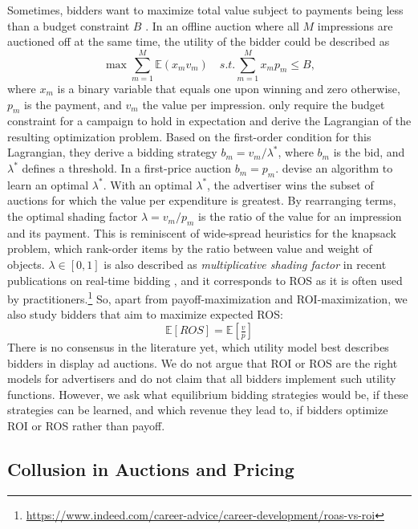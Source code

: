 \documentclass{article}
\begin{document}
Sometimes, bidders want to maximize total value subject to payments being less than a budget constraint 
$B$ \citep{tunuguntla2021near}. In an offline auction where all $M$ impressions are auctioned off at the same time, the utility of the bidder could be described as
\[\max \sum_{m=1}^M\mathbb{E}(x_m v_m) \quad 
s.t. \sum_{m=1}^M x_m p_m \leq B,
\]
where $x_m$ is a binary variable that equals one upon winning and zero otherwise, $p_m$ is the payment, and $v_m$ the value per impression. \citet{tunuguntla2021near} only require the budget constraint for a campaign to hold in expectation and derive the Lagrangian of the resulting optimization problem. Based on the first-order condition for this Lagrangian, they derive a bidding strategy $b_m = v_m/\lambda^*$, where $b_m$ is the bid, and $\lambda^*$ defines a threshold. In a first-price auction $b_m=p_m$. \citet{tunuguntla2021near} devise an algorithm to learn an optimal $\lambda^*$. With an optimal $\lambda^*$, the advertiser wins the subset of auctions for which the value per expenditure is greatest.
By rearranging terms, the optimal shading factor $\lambda=v_m/p_m$ is the ratio of the value for an impression and its payment. This is reminiscent of wide-spread heuristics for the knapsack problem, which rank-order items by the ratio between value and weight of objects. $\lambda \in [0,1]$ is also described as \textit{multiplicative shading factor} in recent publications on real-time bidding \citep{balseiro2019learning, Tardos2022}, and it corresponds to ROS as it is often used by practitioners.\footnote{\url{https://www.indeed.com/career-advice/career-development/roas-vs-roi}} So, apart from payoff-maximization and ROI-maximization, we also study bidders that aim to maximize expected ROS:
\begin{equation*}
	\mathbb{E}[ROS] = \mathbb{E}[\tfrac{v}{p}]
\end{equation*}
%
There is no consensus in the literature yet, which utility model best describes bidders in display ad auctions. We do not argue that ROI or ROS are the right models for advertisers and do not claim that all bidders implement such utility functions. However, we ask what equilibrium bidding strategies would be, if these strategies can be learned, and which revenue they lead to, if bidders optimize ROI or ROS rather than payoff.

\subsection{Collusion in Auctions and Pricing}
\end{document}
